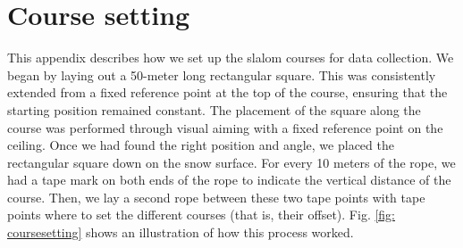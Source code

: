 \documentclass{article}
\begin{document}





\appendix

\section{Course setting}\label{appendixa}
This appendix describes how we set up the slalom courses for data collection. We began by laying out a 50-meter long rectangular square. This was consistently extended from a fixed reference point at the top of the course, ensuring that the starting position remained constant. The placement of the square along the course was performed through visual aiming with a fixed reference point on the ceiling. Once we had found the right position and angle, we placed the rectangular square down on the snow surface. For every 10 meters of the rope, we had a tape mark on both ends of the rope to indicate the vertical distance of the course. Then, we lay a second rope between these two tape points with tape points where to set the different courses (that is, their offset). Fig. \ref{fig: coursesetting} shows an illustration of how this process worked.
\end{document}
